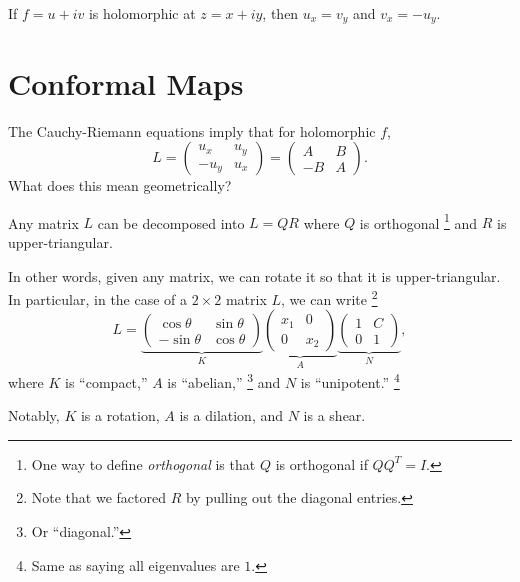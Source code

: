 \begin{tcolorbox}[title=Theorem (Cauchy-Riemann equations)]
  If $f = u + iv$ is holomorphic at $z = x + iy$, then
  $u_x = v_y$ and $v_x = -u_y$.
\end{tcolorbox}

\section{Conformal Maps}
The Cauchy-Riemann equations imply that for holomorphic
$f$,
\[
L =
\left(\begin{matrix}
  u_x & u_y \\
  -u_y & u_x
\end{matrix}\right) =
\left(\begin{matrix}
    A & B \\
    -B & A
\end{matrix}\right)
.\]
What does this mean geometrically?

\begin{tcolorbox}[title=Theorem ($QR$ decomposition)]
  Any matrix $L$ can be decomposed into $L = QR$ where
  $Q$ is orthogonal
  \footnote{One way to define \textit{orthogonal} is that
    $Q$ is orthogonal if $QQ^T = I$.}
  and $R$ is upper-triangular.
\end{tcolorbox}

In other words, given any matrix, we can rotate it so that
it is upper-triangular. In particular, in the case of a
$2 \times 2$ matrix $L$, we can write
\footnote{Note that we factored $R$ by pulling out the
diagonal entries.}
\[
L =
\underbrace{\left(\begin{matrix}
    \cos \theta & \sin \theta \\
    -\sin \theta & \cos \theta
\end{matrix}\right)}_{K}
\underbrace{\left(\begin{matrix}
    x_1 & 0 \\
    0 & x_2
\end{matrix}\right)}_{A}
\underbrace{\left(\begin{matrix}
    1 & C \\
    0 & 1
\end{matrix}\right)}_{N}
,\]
where $K$ is ``compact,'' $A$ is ``abelian,''
\footnote{Or ``diagonal.''}
and $N$ is ``unipotent.''
\footnote{Same as saying all eigenvalues are $1$.}

Notably, $K$ is a rotation, $A$ is a dilation, and $N$
is a shear.

